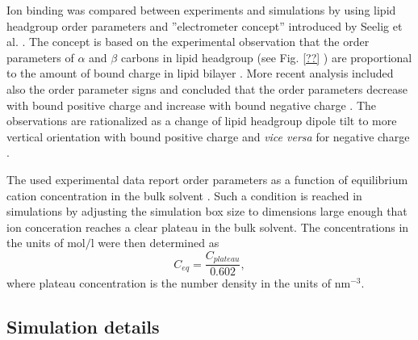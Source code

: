 \documentclass[aip,jcp,twocolumn]{revtex4}
\begin{document}
Ion binding was compared between experiments and simulations by 
using lipid headgroup order parameters and ''electrometer concept'' 
introduced by Seelig et al. \cite{seelig87,catte16}.
The concept is based on the experimental observation that the 
order parameters of $\alpha$ and $\beta$ carbons in lipid headgroup
(see Fig. \ref{??} 
) 
are proportional to the amount of bound charge
in lipid bilayer \cite{seelig87}. More recent analysis included also
the order parameter signs and concluded that the order parameters  
decrease with bound positive charge and increase with bound negative 
charge \cite{ollila16,catte16}. The observations are rationalized 
as a change of lipid headgroup dipole tilt to more vertical orientation
with bound positive charge and {\it vice versa} for negative charge \cite{seelig87}. 

The used experimental data report order parameters as a function of
equilibrium cation concentration in the bulk solvent \cite{akutsu81,altenbach84}.
Such a condition is reached in simulations by adjusting
the simulation box size to dimensions large enough
that ion conceration reaches a clear plateau in the bulk solvent.
The concentrations in the units of $\mathrm{mol/l}$ were then 
determined as
\begin{equation}
  C_{eq}=\frac{C_{plateau}}{0.602},
\end{equation}
where plateau concentration is the number density in the units of $\mathrm{nm}^{-3}$.

\subsection{Simulation details}
\end{document}
